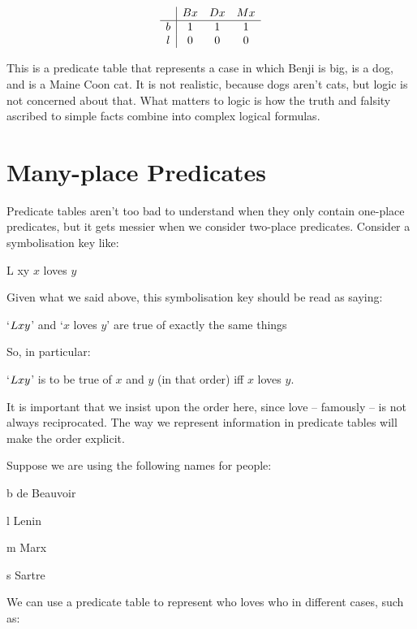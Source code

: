 \documentclass[PHIL101-Textbook.tex]{subfiles}
\begin{document}
\[\begin{array}{c|ccc}
	  &\mathord{B}{x}& \mathord{D}{x}& \mathord{M}{x}\\ \hline
	b & 1 & 1& 1\\
	l & 0 & 0 & 0
\end{array}\]

\indent This is a predicate table that represents a case in which Benji is big, is a dog, and is a Maine Coon cat. It is not realistic, because dogs aren't cats, but logic is not concerned about that. What matters to logic is how the truth and falsity ascribed to simple facts combine into complex logical formulas.




\section{Many-place Predicates}
Predicate tables aren't too bad to understand when they only contain one-place predicates, but it gets messier when we consider two-place predicates. Consider a symbolisation key like:
\begin{ekey}
\item[\atom L xy ] $x$ loves $y$
\end{ekey}
Given what we said above, this symbolisation key should be read as saying:
\begin{earg}
\item[\textbullet] `$\mathord{L}{xy} $' and `$x$ loves $y$' are true of exactly the same things
\end{earg}
So, in particular:
\begin{earg}
\item[\textbullet] `$\mathord{L}{x}y $' is to be true of $x$ and $y$ (in that order) iff $x$ loves $y$.
\end{earg}
It is important that we insist upon the order here, since love -- famously -- is not always reciprocated. The way we represent information in predicate tables will make the order explicit. 

Suppose we are using the following names for people:
\begin{ekey}
\item[b] de Beauvoir
\item[l] Lenin
\item[m] Marx
\item[s] Sartre
\end{ekey}

\noindent We can use a predicate table to represent who loves who in different cases, such as:
\end{document}
